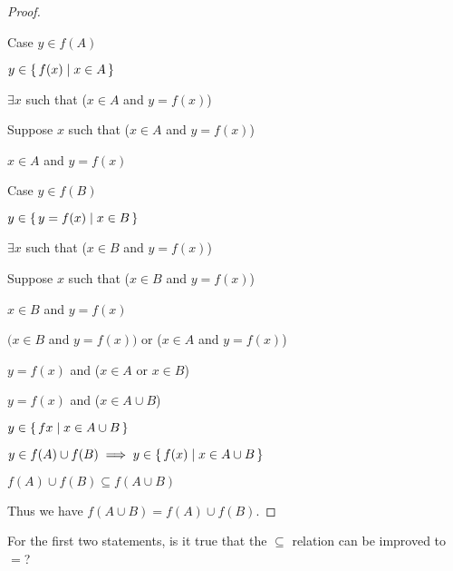 \documentclass[../../main.tex]{subfiles}
\begin{document}
\begin{q}
\begin{enumerate}
\begin{proof}
\begin{lxl}
                \item Case $y \in f(A)$
                \begin{lxl}
                    \item $y \in \{\,f(x)\mid x \in A\,\}$ 
                    \item $\exists x$ such that ($x \in A$ and $y=f(x)$)
                    \item Suppose $x$ such that ($x \in A$ and $y=f(x)$) 
                    \begin{lxl}
                        \item $x \in A$ and $y=f(x)$
                    \end{lxl}
                \end{lxl}
                \item Case $y \in f(B)$
                \begin{lxl}
                    \item $y \in \{\,y=f(x)\mid x \in B\,\}$
                    \item $\exists x$ such that ($x \in B$ and $y=f(x)$)
                    \item Suppose $x$ such that ($x \in B$ and $y=f(x)$)
                    \begin{lxl}
                        \item $x \in B$ and $y=f(x)$
                    \end{lxl}
                \end{lxl}
                \item $(x \in B$ and $y=f(x))$ or ($x \in A$ and $y=f(x)$) 
                \item $y=f(x)$ and ($x \in A$ or $x \in B$) 
                \item $y=f(x)$ and ($x \in A \cup B$)
                \item $y \in \{\,f{x}\mid x \in A \cup B\,\}$
                \item $y \in f(A) \cup f(B) \implies y \in \{\,f(x)\mid x \in A \cup B\,\}$
                \item $f(A) \cup f(B) \subseteq f(A \cup B)$
            \end{lxl}
            Thus we have $f(A \cup B) = f(A) \cup f(B)$.
        \end{proof}
        
    \end{enumerate}
    For the first two statements, is it true that the $\subseteq$ relation can be improved to $=$?


\end{q}
\end{document}

